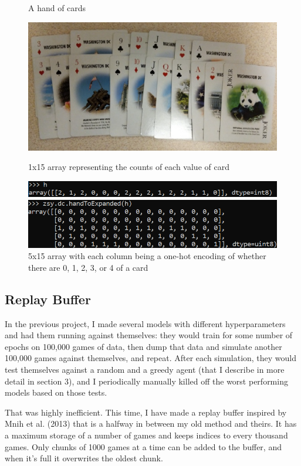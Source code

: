 \documentclass{article}
\begin{document}
\begin{figure}
\begin{center}
\caption{A hand of cards}
\includegraphics[scale=.5]{h1.png}

\caption{1x15 array representing the counts of each value of card}
\includegraphics[scale=.5]{h2.png}

\caption{5x15 array with each column being a one-hot encoding of
whether there are 0, 1, 2, 3, or 4 of a card}
\includegraphics[scale=.5]{h3.png}
\end{center}
\end{figure}

\subsection{Replay Buffer}

In the previous project, I made several models with different hyperparameters and had them running against themselves: they would train for some number of epochs on 100,000 games of data, then dump that data and simulate another 100,000 games against themselves, and repeat. After each simulation, they would test themselves against a random and a greedy agent (that I describe in more detail in section 3), and I periodically manually killed off the worst performing models based on those tests.

That was highly inefficient. This time, I have made a replay buffer inspired by Mnih et al. (2013) that is a halfway in between my old method and theirs. It has a maximum storage of a number of games and keeps indices to every thousand games. Only chunks of 1000 games at a time can be added to the buffer, and when it's full it overwrites the oldest chunk. 
\end{document}
